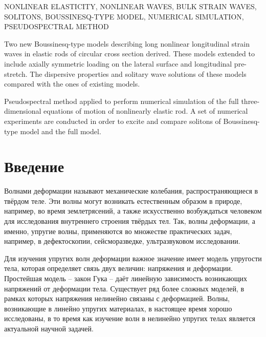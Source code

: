 \documentclass[12pt, a4paper]{report}
\begin{document}
NONLINEAR ELASTICITY, NONLINEAR WAVES, BULK STRAIN WAVES, SOLITONS, BOUSSINESQ-TYPE MODEL, NUMERICAL SIMULATION, PSEUDOSPECTRAL METHOD

Two new Boussinesq-type models describing long nonlinear longitudinal strain waves in elastic rods of circular cross section derived. These models extended to include axially symmetric loading on the lateral surface and longitudinal pre-stretch. The dispersive properties and solitary wave solutions of these models compared with the ones of existing models.

Pseudospectral method applied to perform numerical simulation of the full three-dimensional equations of motion of nonlinearly elastic rod. A set of numerical experiments are conducted in order to excite and compare solitons of Boussinesq-type model and the full model.


\newpage
\setcounter{page}{4}
\tableofcontents



\chapter*{Введение}

Волнами деформации называют механические колебания, распространяющиеся в твёрдом теле. Эти волны могут возникать естественным образом в природе, например, во время землетрясений, а также искусственно возбуждаться человеком для исследования внутреннего строения твёрдых тел. Так, волны деформации, а именно, упругие волны, применяются во множестве практических задач, например, в дефектоскопии, сейсморазведке, ультразвуковом исследовании.

Для изучения упругих волн деформации важное значение имеет модель упругости тела, которая определяет связь двух величин: напряжения и деформации. Простейшая модель -- закон Гука -- даёт линейную зависимость возникающих напряжений от деформации тела. 
Существует ряд более сложных моделей, 
в рамках которых напряжения нелинейно связаны с деформацией. 
Волны, возникающие в линейно упругих материалах, в настоящее время хорошо исследованы, в то время как изучение волн в нелинейно упругих телах является актуальной научной задачей.
\end{document}
